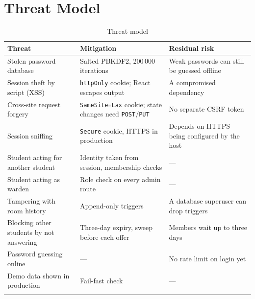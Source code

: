\section{Threat Model}

\begin{longtable}{>{\raggedright\arraybackslash}p{} >{\raggedright\arraybackslash}p{} >{\raggedright\arraybackslash}p{}}
\toprule
\textbf{Threat} & \textbf{Mitigation} & \textbf{Residual risk} \\
\midrule
\endhead
Stolen password database & Salted PBKDF2, 200\,000 iterations & Weak passwords can still be guessed offline \\
Session theft by script (XSS) & \texttt{httpOnly} cookie; React escapes output & A compromised dependency \\
Cross-site request forgery & \texttt{SameSite=Lax} cookie; state changes need \texttt{POST}/\texttt{PUT} & No separate CSRF token \\
Session sniffing & \texttt{Secure} cookie, HTTPS in production & Depends on HTTPS being configured by the host \\
Student acting for another student & Identity taken from session, membership checks & --- \\
Student acting as warden & Role check on every admin route & --- \\
Tampering with room history & Append-only triggers & A database superuser can drop triggers \\
Blocking other students by not answering & Three-day expiry, sweep before each offer & Members wait up to three days \\
Password guessing online & --- & No rate limit on login yet \\
Demo data shown in production & Fail-fast check & --- \\
\bottomrule
\caption{Threat model}
\label{tab:threats}
\end{longtable}
